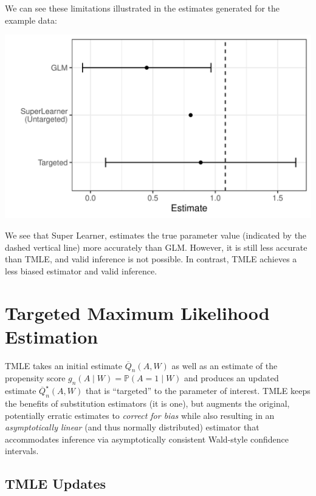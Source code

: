 \documentclass[
  12pt, krantz2,
]{book}
\theoremstyle{definition}
\theoremstyle{definition}
\theoremstyle{definition}
\newcommand{\1}{\mathbbm{1}}
\begin{document}
We can see these limitations illustrated in the estimates generated for the
example data:

\begin{center}\includegraphics[width=0.8\linewidth]{img/png/schematic_3_effects} \end{center}

We see that Super Learner, estimates the true parameter value (indicated by the
dashed vertical line) more accurately than GLM. However, it is still less
accurate than TMLE, and valid inference is not possible. In contrast, TMLE
achieves a less biased estimator and valid inference.

\hypertarget{tmle}{%
\section{Targeted Maximum Likelihood Estimation}\label{tmle}}

TMLE takes an initial estimate \(\overline{Q}_n(A,W)\) as well as an estimate of
the propensity score \(g_n(A \mid W) = \mathbb{P}(A = 1 \mid W)\) and produces an
updated estimate \(\overline{Q}^{\star}_n(A,W)\) that is ``targeted'' to the
parameter of interest. TMLE keeps the benefits of substitution estimators (it is
one), but augments the original, potentially erratic estimates to \emph{correct for
bias} while also resulting in an \emph{asymptotically linear} (and thus normally
distributed) estimator that accommodates inference via asymptotically consistent
Wald-style confidence intervals.

\hypertarget{tmle-updates}{%
\subsection{TMLE Updates}\label{tmle-updates}}
\end{document}
